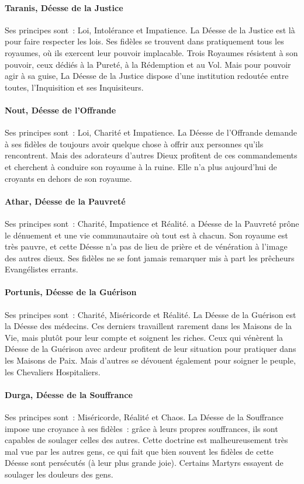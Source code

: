 \documentclass[a4paper,10pt,openany]{book}
\begin{document}
\begin{multicols}{2}
\paragraph{Taranis, Déesse de la Justice}
Ses principes sont : Loi, Intolérance et Impatience. La Déesse de la Justice est là pour faire respecter les lois. Ses fidèles se trouvent dans
pratiquement tous les royaumes, où ils exercent leur pouvoir implacable. Trois Royaumes résistent à son pouvoir, ceux dédiés à la Pureté, à la
Rédemption et au Vol. Mais pour pouvoir agir à sa guise, La Déesse de la Justice dispose d’une institution redoutée entre toutes, l’Inquisition et ses
Inquisiteurs.
\paragraph{Nout, Déesse de l’Offrande}
Ses principes sont : Loi, Charité et Impatience. La Déesse de l’Offrande demande à ses fidèles de toujours avoir quelque chose à offrir aux personnes
qu’ils rencontrent. Mais des adorateurs d’autres Dieux profitent de ces commandements et cherchent à conduire son royaume à la ruine. Elle n’a plus
aujourd’hui de croyants en dehors de son royaume.
\paragraph{Athar, Déesse de la Pauvreté}
Ses principes sont : Charité, Impatience et Réalité. a Déesse de la Pauvreté prône le dénuement et une vie communautaire où tout est à chacun. Son
royaume est très pauvre, et cette Déesse n’a pas de lieu de prière et de vénération à l’image des autres dieux. Ses fidèles ne se font jamais
remarquer mis à part les prêcheurs Evangélistes errants.
\paragraph{Portunis, Déesse de la Guérison}
Ses principes sont : Charité, Miséricorde et Réalité. La Déesse de la Guérison est la Déesse des médecins. Ces derniers travaillent rarement dans les
Maisons de la Vie, mais plutôt pour leur compte et soignent les riches. Ceux qui vénèrent la Déesse de la Guérison avec ardeur profitent de leur
situation pour pratiquer dans les Maisons de Paix. Mais d’autres se dévouent également pour soigner le peuple, les Chevaliers Hospitaliers.
\paragraph{Durga, Déesse de la Souffrance}
Ses principes sont : Miséricorde, Réalité et Chaos. La Déesse de la Souffrance impose une croyance à ses fidèles : grâce à leurs propres souffrances,
ils sont capables de soulager celles des autres. Cette doctrine est malheureusement très mal vue par les autres gens, ce qui fait que bien souvent les
fidèles de cette Déesse sont persécutés (à leur plus grande joie). Certains Martyrs essayent de soulager les douleurs des gens.

\end{multicols}
\end{document}
